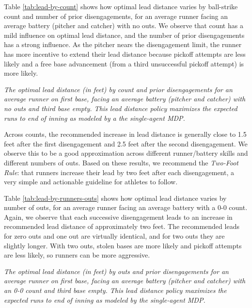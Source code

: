 \documentclass{article}
\begin{document}
      Table \ref{tab:lead-by-count} shows how optimal lead distance varies by ball-strike count and number of prior disengagements, for an average runner facing an average battery (pitcher and catcher) with no outs. We observe that count has a mild influence on optimal lead distance, and the number of prior disengagements has a strong influence. As the pitcher nears the disengagement limit, the runner has more incentive to extend their lead distance because pickoff attempts are less likely and a free base advancement (from a third unsuccessful pickoff attempt) is more likely.
 
      \begin{table}[H]
        \centering
        
        \caption{
          \it The optimal lead distance (in feet) by count and prior disengagements for an average runner on first base, facing an average battery (pitcher and catcher) with no outs and third base empty. This lead distance policy maximizes the expected runs to end of inning as modeled by a the single-agent MDP.
        }
        \label{tab:lead-by-count}
      \end{table}
      
      Across counts, the recommended increase in lead distance is generally close to 1.5 feet after the first disengagement and 2.5 feet after the second disengagement. We observe this to be a good approximation across different runner/battery skills and different numbers of outs. Based on these results, we recommend the {\it Two-Foot Rule}: that runners increase their lead by two feet after each disengagement, a very simple and actionable guideline for athletes to follow.
    
      Table \ref{tab:lead-by-runners-outs} shows how optimal lead distance varies by number of outs, for an average runner facing an average battery with a 0-0 count. Again, we observe that each successive disengagement leads to an increase in recommended lead distance of approximately two feet. The recommended leads for zero outs and one out are virtually identical, and for two outs they are slightly longer. With two outs, stolen bases are more likely and pickoff attempts are less likely, so runners can be more aggressive.

      \begin{table}[H]
        \centering
        
        \caption{
          \it The optimal lead distance (in feet) by outs and prior disengagements for an average runner on first base, facing an average battery (pitcher and catcher) with an 0-0 count and third base empty. This lead distance policy maximizes the expected runs to end of inning as modeled by the single-agent MDP.
        }
        \label{tab:lead-by-runners-outs}
      \end{table}
\end{document}
